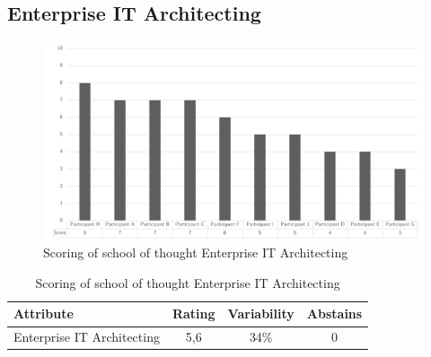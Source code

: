 \subsection{Enterprise IT Architecting}
\begin{figure}[H]
	\centering
	\includegraphics[width=0.9\linewidth]{images/scoreeaschoolenterpriseitarchitecting}
	\caption[Scoring of school of thought Enterprise IT Architecting]{Scoring of school of thought Enterprise IT Architecting}
	\label{fig:appscoringschoolenterpriseitarchitecting}
\end{figure}
\begin{table}[H]
	\centering
	\begin{tabular}{p{}ccc}
		\toprule
		\textbf{Attribute} & \textbf{Rating} & \textbf{Variability} & \textbf{Abstains} \\
		\midrule
		Enterprise IT Architecting & 5,6 & 34\% & 0 \\%
		\bottomrule
	\end{tabular}%
	\caption[Scoring of school of thought Enterprise IT Architecting]{Scoring of school of thought Enterprise IT Architecting}
	\label{tab:appscoringschoolenterpriseitarchitecting}%
\end{table}%

\newpage
